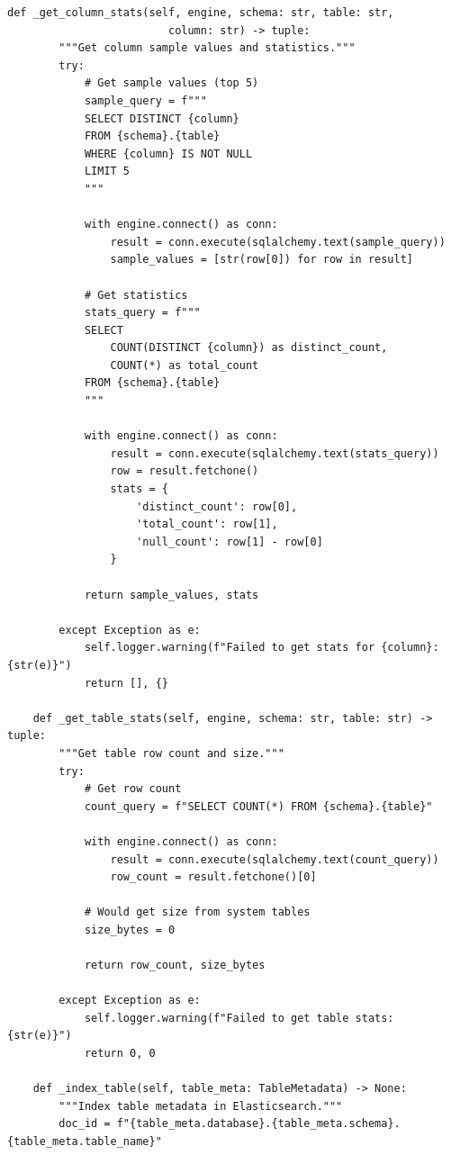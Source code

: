 \begin{lstlisting}[style=python, caption=MetadataCatalog with Automated Metadata Discovery]
    def _get_column_stats(self, engine, schema: str, table: str,
                         column: str) -> tuple:
        """Get column sample values and statistics."""
        try:
            # Get sample values (top 5)
            sample_query = f"""
            SELECT DISTINCT {column}
            FROM {schema}.{table}
            WHERE {column} IS NOT NULL
            LIMIT 5
            """

            with engine.connect() as conn:
                result = conn.execute(sqlalchemy.text(sample_query))
                sample_values = [str(row[0]) for row in result]

            # Get statistics
            stats_query = f"""
            SELECT
                COUNT(DISTINCT {column}) as distinct_count,
                COUNT(*) as total_count
            FROM {schema}.{table}
            """

            with engine.connect() as conn:
                result = conn.execute(sqlalchemy.text(stats_query))
                row = result.fetchone()
                stats = {
                    'distinct_count': row[0],
                    'total_count': row[1],
                    'null_count': row[1] - row[0]
                }

            return sample_values, stats

        except Exception as e:
            self.logger.warning(f"Failed to get stats for {column}: {str(e)}")
            return [], {}

    def _get_table_stats(self, engine, schema: str, table: str) -> tuple:
        """Get table row count and size."""
        try:
            # Get row count
            count_query = f"SELECT COUNT(*) FROM {schema}.{table}"

            with engine.connect() as conn:
                result = conn.execute(sqlalchemy.text(count_query))
                row_count = result.fetchone()[0]

            # Would get size from system tables
            size_bytes = 0

            return row_count, size_bytes

        except Exception as e:
            self.logger.warning(f"Failed to get table stats: {str(e)}")
            return 0, 0

    def _index_table(self, table_meta: TableMetadata) -> None:
        """Index table metadata in Elasticsearch."""
        doc_id = f"{table_meta.database}.{table_meta.schema}.{table_meta.table_name}"


\end{lstlisting}
